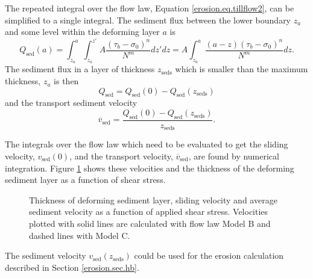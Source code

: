 The repeated integral over the flow law, Equation \eqref{erosion.eq.tillflow2}, can be simplified to a single integral. The sediment flux between the lower boundary $z_a$ and some level within the deforming layer $a$ is
\begin{equation}
  Q_{\text{sed}}(a)=\int_{z_a}^a\int_{z_a}^{z'}A\frac{(\tau_b-\sigma_0)^n}{N^m}dz'dz = A\int_{z_a}^a\frac{(a-z)(\tau_b-\sigma_0)^n}{N^m}dz.
\end{equation}
The sediment flux in a layer of thickness $z_{\text{seds}}$ which is smaller than the maximum thickness, $z_a$ is then
\begin{equation}
  Q_{\text{sed}} = Q_{\text{sed}}(0) - Q_{\text{sed}}(z_{\text{seds}})
\end{equation}
and the transport sediment velocity
\begin{equation}
  \overline{v}_{\text{sed}} = \frac{Q_{\text{sed}}(0) - Q_{\text{sed}}(z_{\text{seds}})}{z_{\text{seds}}}.
\end{equation}

The integrals over the flow law which need to be evaluated to get the sliding velocity, $v_{\text{sed}}(0)$, and the transport velocity, $\overline{v}_{\text{sed}}$, are found by numerical integration. Figure \ref{erosion.fig.sed_velos} shows these velocities and the thickness of the deforming sediment layer as a function of shear stress.

\begin{figure}[htbp]
  \centering
  \caption{Thickness of deforming sediment layer, sliding velocity and average sediment velocity as a function of applied shear stress. Velocities plotted with solid lines are calculated with flow law Model B and dashed lines with Model C.}
  \label{erosion.fig.sed_velos}
\end{figure}

The sediment velocity $v_{\text{sed}}(z_{\text{seds}})$ could be used for the erosion calculation described in Section \ref{erosion.sec.hb}.

